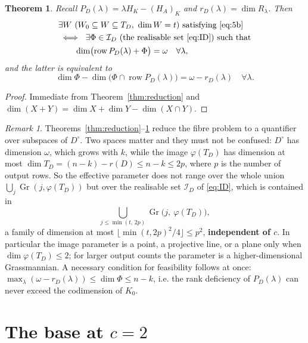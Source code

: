 \documentclass[journal]{IEEEtran}
\theoremstyle{plainn}
\newtheorem{thm}{Theorem}
\theoremstyle{remark}
\newtheorem{remark}{Remark}
\newcommand{\row}{\operatorname{row}}
\newcommand{\Gr}{\operatorname{Gr}}
\begin{document}
\begin{thm}\label{thm:reduced}
Recall $P_D(\lambda)=\lambda H_K-(H_A)_K$ and $r_D(\lambda)=\dim R_\lambda$. Then
\begin{align}
&\exists W\ (W_0\subseteq W\subseteq T_D,\ \dim W=t)\ \text{satisfying \eqref{eq:5b}}\notag\\
&\iff\ \exists\Phi\in\mathcal I_D\ \text{(the realisable set \eqref{eq:ID}) such that}\notag\\
&\qquad\dim\bigl(\row P_D(\lambda)+\Phi\bigr)=\omega\quad\forall\lambda,
\label{eq:reduced}
\end{align}
and the latter is equivalent to
\begin{equation}\label{eq:reduced2}
\dim\Phi-\dim\bigl(\Phi\cap\row P_D(\lambda)\bigr)=\omega-r_D(\lambda)\quad\forall\lambda .
\end{equation}
\end{thm}

\begin{proof}
Immediate from Theorem~\ref{thm:reduction} and $\dim(X+Y)=\dim X+\dim Y-\dim(X\cap Y)$.
\end{proof}

\begin{remark}\label{rem:imagesize}
Theorems~\ref{thm:reduction}--\ref{thm:reduced} reduce the fibre problem to a quantifier over subspaces of
$D^\circ$. Two spaces matter and they must not be confused: $D^\circ$ has dimension $\omega$, which grows
with $k$, while the image $\varphi(T_D)$ has dimension at most
$\dim T_D=(n-k)-r(D)\le n-k\le 2p$, where $p$ is the number of output rows. So the effective parameter
does not range over the whole union $\bigcup_j\Gr(j,\varphi(T_D))$ but over the realisable set
$\mathcal I_D$ of \eqref{eq:ID}, which is contained in
\[
\bigcup_{j\le\min(t,\,2p)}\Gr\bigl(j,\ \varphi(T_D)\bigr),
\]
a family of dimension at most $\lfloor\min(t,2p)^2/4\rfloor\le p^2$, \textbf{independent of $c$}. In
particular the image parameter is a point, a projective line, or a plane only when
$\dim\varphi(T_D)\le2$; for larger output counts the parameter is a higher-dimensional Grassmannian. A
necessary condition for feasibility follows at once:
$\max_\lambda(\omega-r_D(\lambda))\le\dim\Phi\le n-k$, i.e. the rank deficiency of $P_D(\lambda)$ can
never exceed the codimension of $K_0$.
\end{remark}

\section{The base at \texorpdfstring{$c=2$}{c=2}}\label{sec:base}
\end{document}
